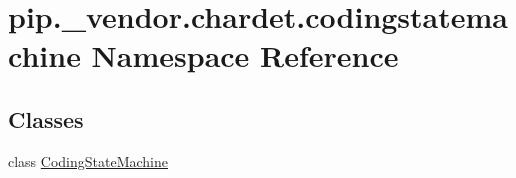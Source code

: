 \hypertarget{namespacepip_1_1__vendor_1_1chardet_1_1codingstatemachine}{}\section{pip.\+\_\+vendor.\+chardet.\+codingstatemachine Namespace Reference}
\label{namespacepip_1_1__vendor_1_1chardet_1_1codingstatemachine}
\subsection*{Classes}
\begin{DoxyCompactItemize}
\item 
class \hyperlink{classpip_1_1__vendor_1_1chardet_1_1codingstatemachine_1_1CodingStateMachine}{Coding\+State\+Machine}
\end{DoxyCompactItemize}

